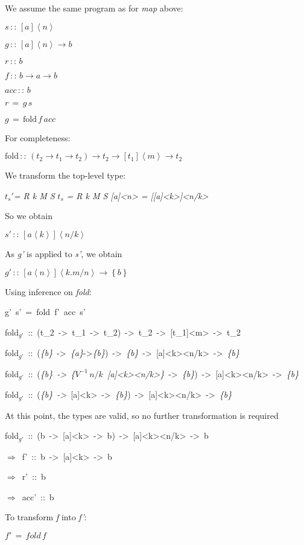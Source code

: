 \documentclass{article}
\newenvironment{lyxcode}
{\par\begin{list}{}{
\setlength{\rightmargin}{\leftmargin}
\setlength{\listparindent}{0pt}\raggedright
\setlength{\itemsep}{0pt}
\setlength{\parsep}{0pt}
\normalfont\ttfamily}\item[]}
{\end{list}}
\begin{document}
We assume the same program as for \emph{map} above:
\begin{lyxcode}
$s\,::\,[a]\left\langle n\right\rangle $

$g\,::\,[a]\left\langle n\right\rangle \rightarrow b$

$r\,::\, b$

$f\,::\, b\rightarrow a\rightarrow b$

$acc\,::\, b$

$r\,=\, g\, s$

$g\,=\,\mbox{fold}\, f\, acc$
\end{lyxcode}
For completeness:
\begin{lyxcode}
$\mbox{fold}\,::\,(t_{2}\rightarrow t_{1}\rightarrow t_{2})\rightarrow t_{2}\rightarrow[t_{1}]\left\langle m\right\rangle \rightarrow t_{2}$


\end{lyxcode}
We transform the top-level type:

$t_{s}'$\emph{= R k M S }$t_{s}$ \emph{= R k M S {[}a{]}<n> = {[}{[}a{]}<k>{]}<n/k>}

So we obtain
\begin{lyxcode}
$s'\,::\,[a\left\langle k\right\rangle ]\left\langle n/k\right\rangle $
\end{lyxcode}
As \emph{g'} is applied to \emph{s'}, we obtain 
\begin{lyxcode}
$g'\,::\,[a\left\langle n\right\rangle ]\left\langle k.m/n\right\rangle \rightarrow\left\{ b\right\} $
\end{lyxcode}
Using inference on \emph{fold}:
\begin{lyxcode}
g'~s'~=~fold~f'~acc~s'

fold$_{g'}$~::~(t\_2~->~t\_1~->~t\_2)~->~t\_2~->~{[}t\_1{]}<m>~->~t\_2

fold$_{g'}$~::~(\emph{\{b\}}~->~\emph{\{a\}}->\emph{\{b\}})~->~\emph{\{b\}}~->~{[}a{]}<k><n/k>~->~\emph{\{b\}}

fold$_{g'}$~::~(\emph{\{b\}~->~\{}$V^{-1}\, n/k$~\emph{{[}a{]}<k><n/k>\}}~->~\emph{\{b\}})~->~{[}a{]}<k><n/k>~->~\emph{\{b\}}

fold$_{g'}$~::~(\emph{\{b\}~->}~{[}a{]}<k>~->~\emph{\{b\}})~->~{[}a{]}<k><n/k>~->~\emph{\{b\}}
\end{lyxcode}
At this point, the types are valid, so no further transformation is
required
\begin{lyxcode}
fold$_{g'}$~::~(b~->~{[}a{]}<k>~->~b)~->~{[}a{]}<k><n/k>~->~b

$\Rightarrow$~f'~::~b~->~{[}a{]}<k>~->~b

$\Rightarrow$~r'~::~b

$\Rightarrow$~acc'~::~b
\end{lyxcode}
To transform \emph{f} into \emph{f'}:
\begin{lyxcode}
$f'\,=\, fold\, f$
\end{lyxcode}
\end{document}
